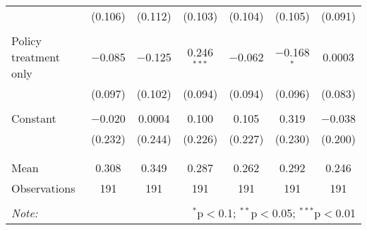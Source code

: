 \begin{tabular}{@{\extracolsep{5pt}}lcccccc}
  & (0.106) & (0.112) & (0.103) & (0.104) & (0.105) & (0.091) \\ 
  & & & & & & \\ 
 Policy treatment only & $-$0.085 & $-$0.125 & 0.246$^{***}$ & $-$0.062 & $-$0.168$^{*}$ & 0.0003 \\ 
  & (0.097) & (0.102) & (0.094) & (0.094) & (0.096) & (0.083) \\ 
  & & & & & & \\ 
 Constant & $-$0.020 & 0.0004 & 0.100 & 0.105 & 0.319 & $-$0.038 \\ 
  & (0.232) & (0.244) & (0.226) & (0.227) & (0.230) & (0.200) \\ 
  & & & & & & \\ 
\hline \\[-1.8ex] 
Mean & 0.308 & 0.349 & 0.287 & 0.262 & 0.292 & 0.246 \\ 
Observations & 191 & 191 & 191 & 191 & 191 & 191 \\ 
\hline 
\hline \\[-1.8ex] 
\textit{Note:}  & \multicolumn{6}{r}{$^{*}$p$<$0.1; $^{**}$p$<$0.05; $^{***}$p$<$0.01} \\ 
\end{tabular} 
